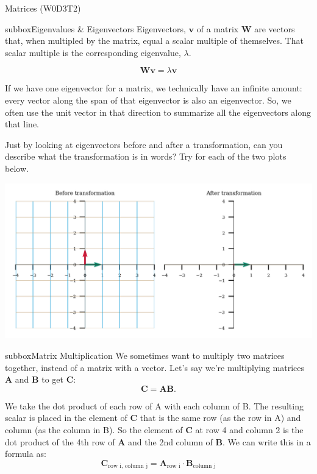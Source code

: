 \begin{multicols}{3}
\begin{textbox}{Matrices (W0D3T2)}
\begin{subbox}{subbox}{Eigenvalues \& Eigenvectors}
\tiny
Eigenvectors, $\mathbf{v}$ of a matrix $\mathbf{W}$ are vectors that, when multipled by the matrix, equal a scalar multiple of themselves. That scalar multiple is the corresponding eigenvalue, $\lambda$.

\begin{equation}
\mathbf{W}\mathbf{v} = \lambda\mathbf{v}
\end{equation}

If we have one eigenvector for a matrix, we technically have an infinite amount: every vector along the span of that eigenvector is also an eigenvector. So, we often use the unit vector in that direction to summarize all the eigenvectors along that line. 

Just by looking at eigenvectors before and after a transformation, can you describe what the transformation is in words? Try for each of the two plots below.

\centering
\includegraphics[scale=0.1]{Figures/PreCourse/Figure5.png}

\end{subbox}

\begin{subbox}{subbox}{Matrix Multiplication}
\tiny
We sometimes want to multiply two matrices together, instead of a matrix with a vector. Let's say we're multiplying matrices $\mathbf{A}$ and $\mathbf{B}$ to get $\mathbf{C}$:
\begin{equation}
\mathbf{C} = \mathbf{A}\mathbf{B}\text{.}
\end{equation}

We take the dot product of each row of A with each column of B. The resulting scalar is placed in the element of $\mathbf{C}$ that is the same row (as the row in A) and column (as the column in B). So the element of $\mathbf{C}$ at row 4 and column 2 is the dot product of the 4th row of $\mathbf{A}$ and the 2nd column of $\mathbf{B}$. We can write this in a formula as:
\begin{equation}\mathbf{C}_{\text{row i, column j}} = \mathbf{A}_{\text{row i}} \cdot \mathbf{B}_{\text{column j}}
\end{equation}
\end{subbox}
\end{textbox}
\end{multicols}